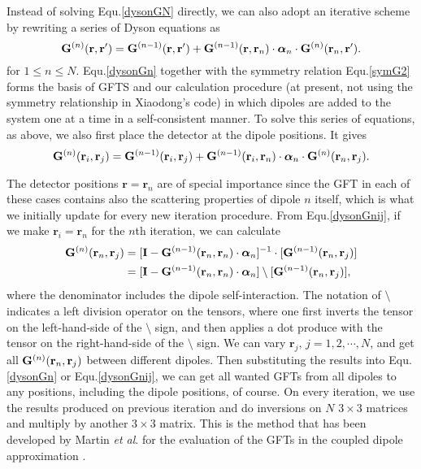 Instead of solving Equ.\eqref{dysonGN} directly, we can also adopt an iterative
scheme by rewriting a series of Dyson equations as
\begin{equation}
 \label{dysonGn}
\Gn(\rr)=\Gm1(\rr)+{\Gm1(\rrn)\cdot {\bm \alpha}_n \cdot \Gn(\mathbf{r}_n,\mathbf{r}')}.
\end{equation}
for $1 \leq  n \leq  N$. Equ.\eqref{dysonGn} together with the symmetry relation Equ.\eqref{symG2} forms
the basis of GFTS and our calculation procedure (at present, not using the symmetry relationship in Xiaodong's code) in which dipoles are
added to the system one at a time in a self-consistent
manner. To solve this series of equations, as above, we also first place the detector at the dipole positions. It gives
\begin{equation}
\label{dysonGnij}
\Gn(\mathbf{r}_i,\mathbf{r}_j)=\Gm1(\mathbf{r}_i,\mathbf{r}_j)+{\Gm1(\mathbf{r}_i,\mathbf{r}_n)\cdot {\bm \alpha}_n\cdot \Gn(\mathbf{r}_n,\mathbf{r}_j)}.
\end{equation}

The detector positions $\mathbf{r}=\mathbf{r}_n$ are of special importance since the GFT in each of these cases contains also the scattering
properties of dipole $n$ itself, which is what we initially update for every new iteration procedure. From Equ.\eqref{dysonGnij}, if we make $\mathbf{r}_i=\mathbf{r}_n$ for the $n$th iteration, we can calculate
\begin{equation}
\begin{split}
\Gn(\mathbf{r}_n,\mathbf{r}_j) &=[{\mathbf{I}-\Gm1(\rnrn)\cdot {\bm \alpha}_n}]^{-1}\cdot [\Gm1(\mathbf{r}_n,\mathbf{r}_j)]\\
            &=[{\mathbf{I}-\Gm1(\rnrn)\cdot {\bm \alpha}_n}]\setminus [\Gm1(\mathbf{r}_n,\mathbf{r}_j)],
\end{split}
\label{Gnself}
\end{equation}
where the denominator includes the dipole self-interaction. The notation of $\setminus$ indicates a left division operator on the tensors, where one first inverts the tensor on the left-hand-side of the $\setminus$ sign, and then applies a dot produce with the tensor on the right-hand-side of the $\setminus$ sign. We can vary $\mathbf{r}_j,\, j=1,2,\cdots,N$, and get all $\mathbf{G}^{(n)}(\mathbf{r}_n,\mathbf{r}_j)$ between different dipoles. Then substituting the results into Equ.\eqref{dysonGn} or Equ.\eqref{dysonGnij}, we can get all wanted GFTs from all dipoles to any positions, including the dipole positions, of course. On every iteration, we use the results produced on previous iteration and do inversions on $N$ $3\times 3$ matrices and multiply by another $3\times 3$ matrix. This is the method that has been developed by Martin {\it{et al}}. for the evaluation of the GFTs in the coupled dipole approximation \cite{Martin1994}.

